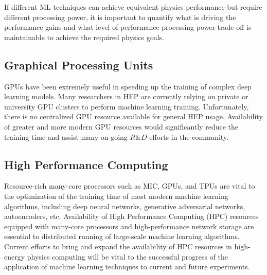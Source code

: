 If different ML techniques can achieve equivalent physics performance but require different processing power, it is important to quantify what is driving the performance gains and what level of performance-processing power trade-off is maintainable to achieve the required physics goals.

\subsection{Graphical Processing Units}\label{subsec:GPU}

GPUs have been extremely useful in speeding up the training of complex deep learning models. Many researchers in HEP are currently relying on private or university GPU clusters to perform machine learning training. Unfortunately, there is no centralized GPU resource available for general HEP usage. Availability of greater and more modern GPU resources would significantly reduce the training time and assist many on-going $R\&D$ efforts in the community.

\subsection{High Performance Computing}

Resource-rich many-core processors such as MIC, GPUs, and TPUs are vital to the optimization of the training time of most modern machine learning algorithms, including deep neural networks, generative adversarial networks, autoencoders, etc. Availability of High Performance Computing (HPC) resources equipped with many-core processors and high-performance network storage are essential to distributed running of large-scale machine learning algorithms. Current efforts to bring and expand the availability of HPC resources in high-energy physics computing will be vital to the successful progress of the application of machine learning techniques to current and future experiments.



